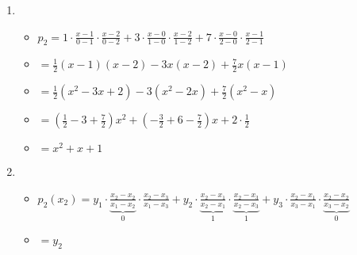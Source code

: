 \item
\begin{enumerate}

\item
\begin{itemize}
\item $p_2 =
1\cdot\frac{x-1}{0-1}\cdot\frac{x-2}{0-2} +
3\cdot\frac{x-0}{1-0}\cdot \frac{x-2}{1-2} +
7\cdot\frac{x-0}{2-0}\cdot\frac{x-1}{2-1}$
\item $=\frac{1}{2}(x-1)(x-2)-3x(x-2)+\frac{7}{2}x(x-1)$
\item $=\frac{1}{2}(x^2-3x+2)-3(x^2-2x)+\frac{7}{2}(x^2-x)$
\item $=(\frac{1}{2}-3+\frac{7}{2})x^2+(-\frac{3}{2}+6-\frac{7}{2})x+2\cdot\frac{1}{2}$
\item $=x^2+x+1$
\end{itemize}

\item
\begin{itemize}
\item $p_2(x_2) =
y_1\cdot\underbrace{\frac{x_2-x_2}{x_1-x_2}}_0\cdot\frac{x_2-x_3}{x_1-x_3} +
y_2\cdot\underbrace{\frac{x_2-x_1}{x_2-x_1}}_1\cdot\underbrace{\frac{x_2-x_3}{x_2-x_3}}_1 +
y_3\cdot\frac{x_2-x_1}{x_3-x_1}\cdot\underbrace{\frac{x_2-x_2}{x_3-x_2}}_0$
\item $=y_2$
\end{itemize}

\end{enumerate}
